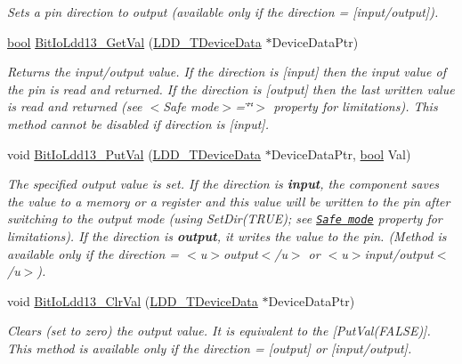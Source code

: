 \begin{DoxyCompactItemize}
\begin{DoxyCompactList}\small\item\em Sets a pin direction to output (available only if the direction = {\itshape \mbox{[}input/output\mbox{]}}). \end{DoxyCompactList}\item 
\hyperlink{group___p_e___types__module_ga97a80ca1602ebf2303258971a2c938e2}{bool} \hyperlink{group___bit_io_ldd13__module_ga91a8447c1b3c4ab44bfa626ee06b0175}{Bit\+Io\+Ldd13\+\_\+\+Get\+Val} (\hyperlink{group___p_e___types__module_gac5cf1362f1f0e3a2ce71b1bf2276d091}{L\+D\+D\+\_\+\+T\+Device\+Data} $\ast$Device\+Data\+Ptr)
\begin{DoxyCompactList}\small\item\em Returns the input/output value. If the direction is \mbox{[}input\mbox{]} then the input value of the pin is read and returned. If the direction is \mbox{[}output\mbox{]} then the last written value is read and returned (see $<$\+Safe mode$>$=\char`\"{}\char`\"{}$>$ property for limitations). This method cannot be disabled if direction is \mbox{[}input\mbox{]}. \end{DoxyCompactList}\item 
void \hyperlink{group___bit_io_ldd13__module_ga9e36ef0c8392418090d73328ba1b1d72}{Bit\+Io\+Ldd13\+\_\+\+Put\+Val} (\hyperlink{group___p_e___types__module_gac5cf1362f1f0e3a2ce71b1bf2276d091}{L\+D\+D\+\_\+\+T\+Device\+Data} $\ast$Device\+Data\+Ptr, \hyperlink{group___p_e___types__module_ga97a80ca1602ebf2303258971a2c938e2}{bool} Val)
\begin{DoxyCompactList}\small\item\em The specified output value is set. If the direction is {\bfseries  input}, the component saves the value to a memory or a register and this value will be written to the pin after switching to the output mode (using {\ttfamily Set\+Dir(\+T\+R\+U\+E)}; see \href{BitIOProperties.html#SafeMode}{\tt Safe mode} property for limitations). If the direction is {\bfseries output}, it writes the value to the pin. (Method is available only if the direction = $<$u$>${\ttfamily output}$<$/u$>$ or $<$u$>${\ttfamily  input/output}$<$/u$>$). \end{DoxyCompactList}\item 
void \hyperlink{group___bit_io_ldd13__module_gad416cb8b9b15c2afb948ef359da7140d}{Bit\+Io\+Ldd13\+\_\+\+Clr\+Val} (\hyperlink{group___p_e___types__module_gac5cf1362f1f0e3a2ce71b1bf2276d091}{L\+D\+D\+\_\+\+T\+Device\+Data} $\ast$Device\+Data\+Ptr)
\begin{DoxyCompactList}\small\item\em Clears (set to zero) the output value. It is equivalent to the \mbox{[}Put\+Val(\+F\+A\+L\+S\+E)\mbox{]}. This method is available only if the direction = {\itshape \mbox{[}output\mbox{]}} or {\itshape \mbox{[}input/output\mbox{]}}. \end{DoxyCompactList}\item 

\end{DoxyCompactItemize}
